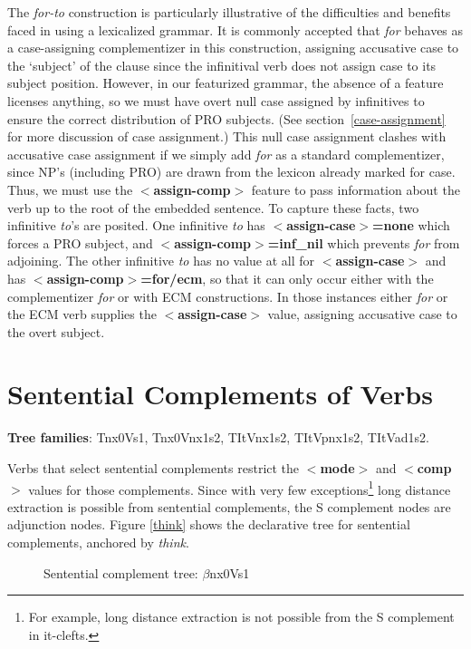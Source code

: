 The {\it for-to\/} construction is particularly illustrative of the
difficulties and benefits faced in using a lexicalized grammar.  It is
commonly accepted that {\it for\/} behaves as a case-assigning
complementizer in this construction, assigning accusative case to the
`subject' of the clause since the infinitival verb does not assign
case to its subject position.  However, in our featurized grammar, the
absence of a feature licenses anything, so we must have overt null
case assigned by infinitives to ensure the correct distribution of PRO
subjects. (See section~\ref{case-assignment} for more discussion of
case assignment.)  This null case assignment clashes with accusative
case assignment if we simply add {\it for\/} as a standard
complementizer, since NP's (including PRO) are drawn from the lexicon
already marked for case.  Thus, we must use the {\bf
$<$assign-comp$>$} feature to pass information about the verb up to
the root of the embedded sentence.  To capture these facts, two
infinitive {\it to}'s are posited. One infinitive {\it to\/} has {\bf
$<$assign-case$>$=none} which forces a PRO subject, and {\bf
$<$assign-comp$>$=inf\_nil} which prevents {\it for\/} from
adjoining. The other infinitive {\it to\/} has no value at all for
{\bf $<$assign-case$>$} and has {\bf $<$assign-comp$>$=for/ecm}, so that
it can only occur either with the complementizer {\it for\/} or with
ECM constructions. In those
instances either {\it for} or the ECM verb
supplies the {\bf $<$assign-case$>$} value, assigning
 accusative case to the overt subject.
 
\section{Sentential Complements of Verbs}
\label{sent-complements}
{\bf Tree families}: Tnx0Vs1, Tnx0Vnx1s2, TItVnx1s2, TItVpnx1s2, TItVad1s2. 


Verbs that select sentential complements restrict the {\bf $<$mode$>$}
and {\bf $<$comp$>$} values for those complements. Since with very few
exceptions\footnote{For example, long distance extraction is not
possible from the S complement in it-clefts.} long distance extraction
is possible from sentential complements, the S complement nodes are
adjunction nodes. Figure \ref{think} shows the declarative tree
for sentential complements, anchored by {\it think}.  

\begin{figure}[hbt]
\centering
\hspace{0.0in}
\caption{Sentential complement tree: $\beta$nx0Vs1}
\label{think}
\label{2;1,10}
\end{figure}

